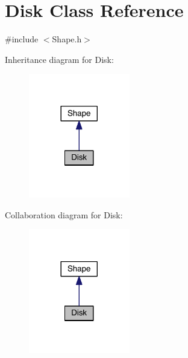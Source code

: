 \hypertarget{class_disk}{}\section{Disk Class Reference}
\label{class_disk}


{\ttfamily \#include $<$Shape.\+h$>$}



Inheritance diagram for Disk\+:\nopagebreak
\begin{figure}[H]
\begin{center}
\leavevmode
\includegraphics[width=125pt]{d1/d6d/class_disk__inherit__graph}
\end{center}
\end{figure}


Collaboration diagram for Disk\+:\nopagebreak
\begin{figure}[H]
\begin{center}
\leavevmode
\includegraphics[width=125pt]{d3/dc6/class_disk__coll__graph}
\end{center}
\end{figure}
